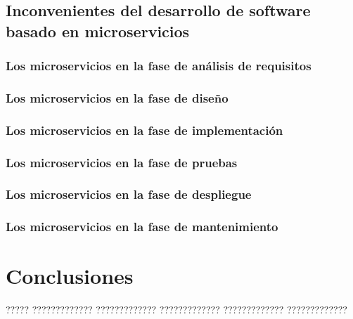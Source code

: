 \documentclass[11pt,spanish,listoffigures,listoftables]{tfgetsinf}
\begin{document}
\section{Inconvenientes del desarrollo de software basado en microservicios}

\subsection{Los microservicios en la fase de análisis de requisitos}

\subsection{Los microservicios en la fase de diseño}

\subsection{Los microservicios en la fase de implementación}

\subsection{Los microservicios en la fase de pruebas}

\subsection{Los microservicios en la fase de despliegue}

\subsection{Los microservicios en la fase de mantenimiento}


\chapter{Conclusiones}

????? ????????????? ????????????? ????????????? ????????????? ????????????? 

\end{document}
